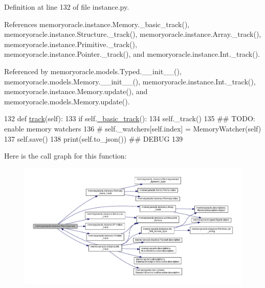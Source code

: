 Definition at line 132 of file instance.\+py.



References memoryoracle.\+instance.\+Memory.\+\_\+basic\+\_\+track(), memoryoracle.\+instance.\+Structure.\+\_\+track(), memoryoracle.\+instance.\+Array.\+\_\+track(), memoryoracle.\+instance.\+Primitive.\+\_\+track(), memoryoracle.\+instance.\+Pointer.\+\_\+track(), and memoryoracle.\+instance.\+Int.\+\_\+track().



Referenced by memoryoracle.\+models.\+Typed.\+\_\+\+\_\+init\+\_\+\+\_\+(), memoryoracle.\+models.\+Memory.\+\_\+\+\_\+init\+\_\+\+\_\+(), memoryoracle.\+instance.\+Int.\+\_\+track(), memoryoracle.\+instance.\+Memory.\+update(), and memoryoracle.\+models.\+Memory.\+update().


\begin{DoxyCode}
132     \textcolor{keyword}{def }\hyperlink{classmemoryoracle_1_1instance_1_1Memory_a8951ac234fecbd6cd473133ae7e63662}{track}(self):
133         \textcolor{keywordflow}{if} self.\hyperlink{classmemoryoracle_1_1instance_1_1Memory_ac50fd3bb7216dc0481b8c6f23831a998}{\_basic\_track}():
134             self.\_track()
135             \textcolor{comment}{## TODO: enable memory watchers}
136             \textcolor{comment}{# self.\_watchers[self.index] = MemoryWatcher(self)}
137             self.save()
138             print(self.to\_json()) \textcolor{comment}{## DEBUG}
139 
\end{DoxyCode}


Here is the call graph for this function\+:
\nopagebreak
\begin{figure}[H]
\begin{center}
\leavevmode
\includegraphics[width=350pt]{classmemoryoracle_1_1instance_1_1Memory_a8951ac234fecbd6cd473133ae7e63662_cgraph}
\end{center}
\end{figure}





